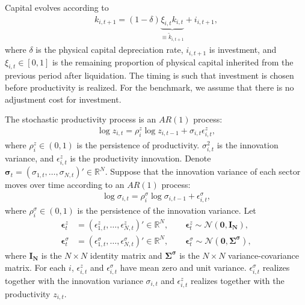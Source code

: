 \documentclass[12pt]{article}
\numberwithin{equation}{section}
\begin{document}
Capital evolves according to
\begin{align}\label{eq:capital_accumulation}
    k_{i,t+1}
    = (1-\delta) \underbrace{\xi_{i,t} k_{i,t}}_{\equiv \tilde{k}_{i,t+1}} + i_{i,t+1},
\end{align}
where $\delta$ is the physical capital depreciation rate, $i_{i,t+1}$ is investment, and $\xi_{i,t}\in[0,1]$ is the remaining proportion of physical capital inherited from the previous period after liquidation. The timing is such that investment is chosen before productivity is realized. For the benchmark, we assume that there is no adjustment cost for investment.

The stochastic productivity process is an $AR(1)$ process:
\begin{align}\label{eq:productivity_process}
    \log z_{i,t}
    = \rho^z_{i} \log z_{i,t-1}
    +\sigma_{i,t}\epsilon^z_{i,t},
\end{align}
where $\rho^z_{i}\in(0,1)$ is the persistence of productivity. $\sigma_{i,t}^2$ is the innovation variance, and $\epsilon^z_{i,t}$ is the productivity innovation. Denote $\boldsymbol \sigma_t = (\sigma_{1,t},\ldots,\sigma_{N,t})'\in \mathbb{R}^N$. Suppose that the innovation variance of each sector moves over time according to an $AR(1)$ process: 
\begin{align}\label{eq:innovation_variance_process}
    \log \sigma_{i,t} = \rho^\sigma_{i} \log \sigma_{i,t-1} + \epsilon^\sigma_{i,t},
\end{align}
where $\rho^\sigma_{i}\in(0,1)$ is the persistence of the innovation variance. Let
\begin{align*}
    \boldsymbol\epsilon^z_t
    &=
    (\epsilon^z_{1,t},\ldots,\epsilon^z_{N,t})'\in \mathbb{R}^N,
    \qquad
    \boldsymbol\epsilon^z_t
    \sim
    \mathcal N(\mathbf 0, \mathbf{I_N}), \\
    \boldsymbol\epsilon^\sigma_t
    &=
    (\epsilon^\sigma_{1,t},\ldots,\epsilon^\sigma_{N,t})'\in \mathbb{R}^N,
    \qquad
    \boldsymbol\epsilon^\sigma_t
    \sim
    \mathcal N(\mathbf 0, \mathbf{\Sigma^\sigma}),
\end{align*}
where $\mathbf{I_N}$ is the $N\times N$ identity matrix and $\mathbf{\Sigma^\sigma}$ is the $N\times N$ variance-covariance matrix. For each $i$, $\epsilon^z_{i,t}$ and $\epsilon^\sigma_{i,t}$ have mean zero and unit variance. $\epsilon^\sigma_{i,t}$ realizes together with the innovation variance $\sigma_{i,t}$ and $\epsilon^z_{i,t}$ realizes together with the productivity $z_{i,t}$.
\end{document}
